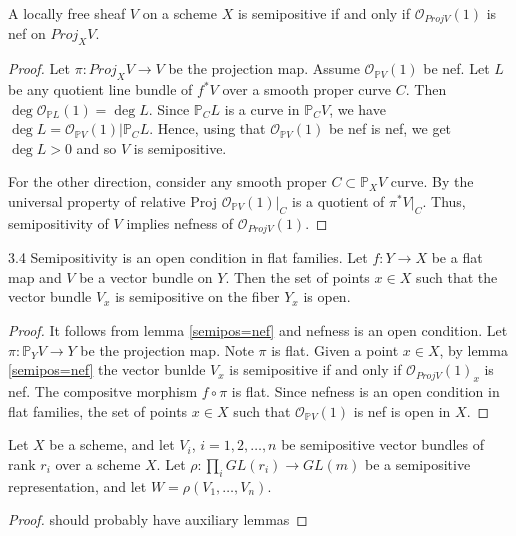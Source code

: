 \begin{lemma}\label{semipos=nef}
A locally free sheaf $V$ on a scheme $X$ is semipositive if and only if $\mathcal{O}_{Proj V}(1)$ is nef on $Proj_XV$.
\end{lemma}
\begin{proof}
Let $\pi: Proj_X V\to V$ be the projection map. Assume $\mathcal{O}_{\mathbb{P}V}(1)$ be nef. Let $L$ be  any quotient line bundle of $f^*V$ over a smooth proper curve $C$. Then $\deg \mathcal{O}_{\mathbb{P}L}(1)=\deg L$. Since $\mathbb{P}_CL$ is a curve in $\mathbb{P}_CV$, we have $\deg L=\mathcal{O}_{\mathbb{P}V}(1)|\mathbb{P}_CL$. Hence, using that $\mathcal{O}_{\mathbb{P}V}(1)$ be nef is nef, we get $\deg L>0$ and so $V$ is semipositive.

For the other direction, consider any smooth proper $C\subset \mathbb{P}_XV$ curve. By the universal property of relative Proj $\mathcal{O}_{\mathbb{P}V}(1)|_C$ is a quotient of $\pi^*V|_C$. Thus, semipositivity of $V$ implies nefness of $\mathcal{O}_{Proj V}(1)$.
\end{proof}

\begin{lemma}
3.4 Semipositivity is an open condition in flat families.
Let $f:Y\to X$ be a flat map and $V$ be a vector bundle on $Y$. Then the set of points $x\in X$ such that the vector bundle $V_x$ is semipositive on the fiber $Y_x$ is open.
\end{lemma}
\begin{proof}
It follows from lemma \ref{semipos=nef} and nefness is an open condition.
Let $\pi:\mathbb{P}_YV\to Y$ be the projection map.  Note $\pi$ is flat. Given a point $x\in X$, by lemma \ref{semipos=nef} the vector bunlde $V_x$ is semipositive if and only if $\mathcal{O}_{Proj V}(1)_x$ is nef. The compositve morphism $f\circ \pi$ is flat. Since nefness is an open condition in flat families, the set of points $x\in X$ such that $\mathcal{O}_{\mathbb{P}V}(1)$ is nef is open in $X$.
\end{proof}

\begin{lemma}
Let $X$ be a scheme, and let $V_i$, $i=1,2,\ldots,n$ be semipositive vector bundles of rank $r_i$ over a scheme $X$. Let $\rho:\prod_i GL(r_i)\to GL(m)$ be a semipositive representation, and let $W=\rho(V_1,\ldots,V_n)$. 
\end{lemma}

\begin{proof}
should probably have auxiliary lemmas
\end{proof}

